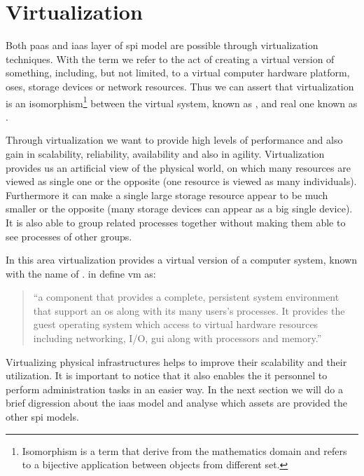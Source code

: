 %
%
\section{Virtualization}
\label{sec:background-virtualization}
Both \ac{paas} and \ac{iaas} layer of \ac{spi} model are possible through virtualization techniques.
With the term  we refer to the act of creating a virtual version of something,
including, but not limited, to a virtual computer hardware platform, \acs{os}es, storage devices or
network resources. Thus we can assert that virtualization is an isomorphism\footnote{Isomorphism is
a term that derive from the mathematics	domain and refers to a bijective application between objects
from different set.} between the virtual system, known as , and real one known as
.

Through virtualization we want to provide high levels of performance and also gain in scalability,
reliability, availability and also in agility. Virtualization provides us an artificial view of the
physical world, on which many resources are viewed as single one or the opposite (one resource
is viewed as many individuals). Furthermore it can make a single large storage resource appear to be much
smaller or the opposite (many storage devices can appear as a big single device). It is also able to group
related processes together without making them able to see processes of other groups.

In this area virtualization provides a virtual version of a computer system, known with the name of
. \citeauthor{vmArchitecture} in \cite{vmArchitecture} define \ac{vm} as:

\begin{quote}
	``a component that provides a complete, persistent system environment that support an \acs{os}
	along with its many users's processes. It provides the guest operating system which access to
	virtual hardware resources including networking, I/O, \ac{gui} along with processors and memory.''
\end{quote}

Virtualizing physical infrastructures helps to improve their scalability and their utilization. It is 
important to notice that it also enables the \acs{it} personnel to perform administration tasks in an
easier way. In the next section we will do a brief digression about the \ac{iaas} model and analyse
which assets are provided the other \ac{spi} models.

